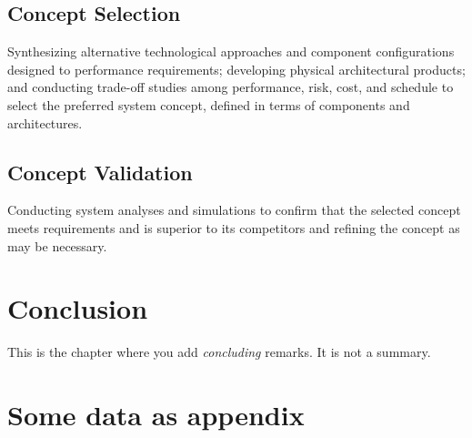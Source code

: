 \documentclass[a4paper,11pt,fleqn]{report}
\begin{document}
\section{Concept Selection}
Synthesizing alternative technological approaches and component configurations designed to performance requirements; developing physical architectural products; and conducting trade-off studies among performance, risk, cost, and schedule to select the preferred system concept, defined in terms of components and architectures. 

\section{Concept Validation}
Conducting system analyses and simulations to confirm that the selected concept meets requirements and is superior to its competitors and refining the concept as may be necessary. 

\chapter{Conclusion}
\acresetall
This is the chapter where you add \emph{concluding} remarks. It is not a summary.





\appendix
\chapter{Some data as appendix}
\end{document}
